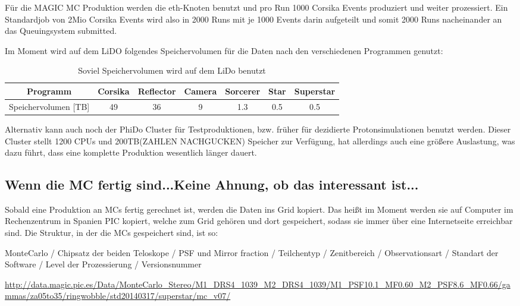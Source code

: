 Für die MAGIC MC Produktion werden die eth-Knoten benutzt und pro Run 1000 Corsika Events produziert und weiter prozessiert. 
Ein Standardjob von 2Mio Corsika Events wird also in 2000 Runs mit je 1000 Events darin aufgeteilt und somit 2000 Runs nacheinander an das Queuingsystem submitted.


Im Moment wird auf dem LiDO folgendes Speichervolumen für die Daten nach den verschiedenen Programmen genutzt:

\begin{table}[h!]
    \centering
    \caption{Soviel Speichervolumen wird auf dem LiDo benutzt}
    \label{tab:bsp}
    \begin{tabular}{ccccccc}
        \toprule
        Programm & Corsika & Reflector & Camera & Sorcerer & Star & Superstar\\
        \midrule
        Speichervolumen [TB] & 49 & 36 & 9 & 1.3 & 0.5 & 0.5\\
        \bottomrule
    \end{tabular}
\end{table}

Alternativ kann auch noch der PhiDo Cluster für Testproduktionen, bzw. früher für dezidierte Protonsimulationen benutzt werden. 
Dieser Cluster stellt 1200 CPUs und 200TB(ZAHLEN NACHGUCKEN) Speicher zur Verfügung, hat allerdings auch eine größere Auslastung, was dazu führt, dass eine komplette Produktion wesentlich länger dauert.



\subsection{Wenn die MC fertig sind...Keine Ahnung, ob das interessant ist...}
Sobald eine Produktion an MCs fertig gerechnet ist, werden die Daten ins Grid kopiert.
Das heißt im Moment werden sie auf Computer im Rechenzentrum in Spanien PIC kopiert, welche zum Grid gehören und dort gespeichert, sodass sie immer über eine Internetseite erreichbar sind.
Die Struktur, in der die MCs gespeichert sind, ist so: 

MonteCarlo / Chipsatz der beiden Teloskope / PSF und Mirror fraction / Teilchentyp / Zenitbereich / Observationsart / Standart der Software / Level der Prozessierung / Versionsnummer \newline

\url{http://data.magic.pic.es/Data/MonteCarlo_Stereo/M1_DRS4_1039_M2_DRS4_1039/M1_PSF10.1_MF0.60_M2_PSF8.6_MF0.66/gammas/za05to35/ringwobble/std20140317/superstar/mc_v07/}


